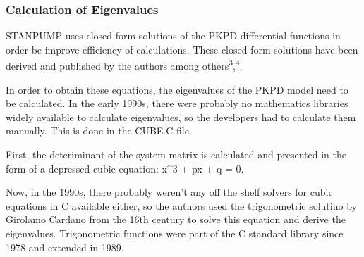 \documentclass[
  letterpaper,
  DIV=11,
  numbers=noendperiod]{scrartcl}
\begin{document}
\subsubsection{Calculation of
Eigenvalues}\label{calculation-of-eigenvalues}

STANPUMP uses closed form solutions of the PKPD differential functions
in order be improve efficiency of calculations. These closed form
solutions have been derived and published by the authors among
others\textsuperscript{3},\textsuperscript{4}.

In order to obtain these equations, the eigenvalues of the PKPD model
need to be calculated. In the early 1990s, there were probably no
mathematics libraries widely available to calculate eigenvalues, so the
developers had to calculate them manually. This is done in the CUBE.C
file.

First, the deteriminant of the system matrix is calculated and presented
in the form of a depressed cubic equation: x\^{}3 + px + q = 0.

Now, in the 1990s, there probably weren't any off the shelf solvers for
cubic equations in C available either, so the authors used the
trigonometric solutino by Girolamo Cardano from the 16th century to
solve this equation and derive the eigenvalues. Trigonometric functions
were part of the C standard library since 1978 and extended in 1989.
\end{document}

